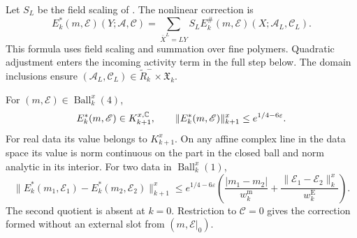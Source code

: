 Let $S_L$ be the field scaling of
. The nonlinear correction is
\begin{equation}\label{eq:rgnl-scaled-correction}
 E_k^*(m,\mathscr E)(Y;\mathscr A,\mathscr C)
  =\sum_{\bar X^L=LY}S_L
        E_k^\#(m,\mathscr E)(X;\mathscr A_L,\mathscr C_L).
\end{equation}
This formula uses field scaling and summation over fine
polymers. Quadratic adjustment enters the incoming
activity term in the full step below.
The domain inclusions
 ensure
$(\mathscr A_L,\mathscr C_L)
\in\widetilde R_k^-\times\mathfrak X_k$.

\begin{proposition}\label{prop:rgnl-scaled-correction}
For $(m,\mathscr E)\in\operatorname{Ball}_k^x(4)$,
\[
 E_k^*(m,\mathscr E)\in K_{k+1}^{x,\mathbb C},\qquad
                  \|E_k^*(m,\mathscr E)\|_{k+1}^x
                                      \le e^{1/4-6\varepsilon}.
\]
For real data its value belongs to $K_{k+1}^x$.
On any affine complex line in the data space its value
is norm continuous on the part in the closed ball and
norm analytic in its interior.
For two data in $\operatorname{Ball}_k^x(1)$,
\begin{equation}\label{eq:rgnl-coupling-Lipschitz}
 \|E_k^*(m_1,\mathscr E_1)-E_k^*(m_2,\mathscr E_2)\|_{k+1}^x
 \le e^{1/4-6\varepsilon}
       \left(\frac{|m_1-m_2|}{w_k^{\mathrm m}}
              +\frac{\|\mathscr E_1-\mathscr E_2\|_k^x}
                                                    {w_k^{\mathrm E}}\right).
\end{equation}
The second quotient is absent at $k=0$.
Restriction to $\mathscr C=0$ gives the correction formed
without an external slot from $(m,\mathscr E|_0)$.
\end{proposition}

